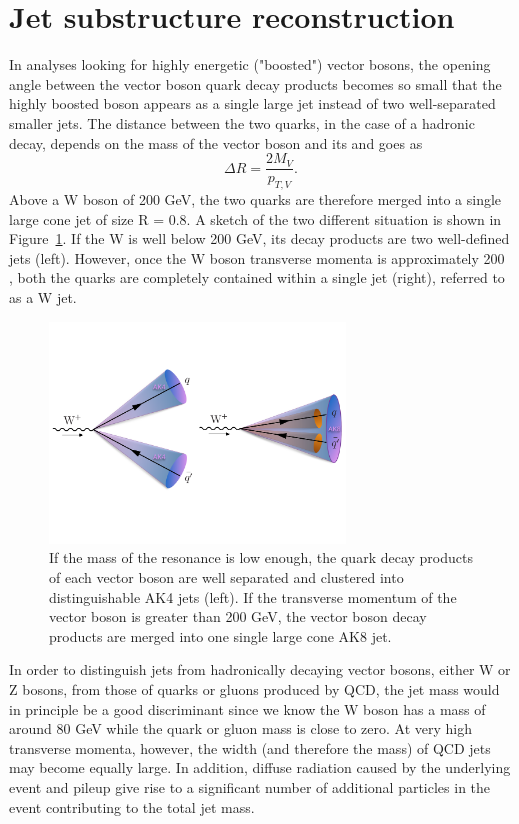\section{Jet substructure reconstruction}
\label{sec:objreco:substructure}
In analyses looking for highly energetic ("boosted") vector bosons, the opening angle between the vector boson quark decay products becomes so small that the highly boosted boson appears as a single large jet instead of two well-separated smaller jets. The distance between the two quarks, in the case of a hadronic decay, depends on the mass of the vector boson and its \PT and goes as
\begin{equation}  
\Delta R = \frac{2 M_{V}}{p_{T,V}}.  
\end{equation}
Above a W boson \PT of 200 GeV, the two quarks are therefore merged into a single large cone jet of size R = 0.8. A sketch of the two different situation is shown in Figure~\ref{fig:objreco:mergedvsunmerged}. If the W \PT is well below 200 GeV, its decay products are two well-defined jets (left). However, once the W boson transverse momenta is approximately 200 \GeV, both the quarks are completely contained within a single jet (right), referred to as a W jet.
\begin{figure}[h] 
    \centering
    \includegraphics[width=0.70\textwidth]{figures/event_reconstruction/merged_vs_unmerged.pdf}
    \caption{If the mass of the resonance is low enough, the quark decay products of each vector boson are well separated and clustered into distinguishable AK4 jets (left). If the transverse momentum of the vector boson is greater than 200 GeV, the vector boson decay products are merged into one single large cone AK8 jet.}
    \label{fig:objreco:mergedvsunmerged}
\end{figure}
In order to distinguish jets from hadronically decaying vector bosons, either W or Z bosons, from those of quarks or gluons produced by QCD, the jet mass would in principle be a good discriminant since we know the W boson has a mass of around 80 GeV while the quark or gluon mass is close to zero. At very high transverse momenta, however, the width (and therefore the mass) of QCD jets may become equally large. In addition, diffuse radiation caused by the underlying event and pileup give rise to a significant number of additional particles in the event contributing to the total jet mass.

